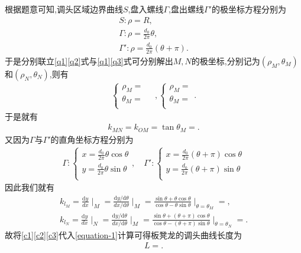 \documentclass[lang=cn,newtx,10pt,scheme=chinese]{../Template/elegantbook}
\begin{document}
根据题意可知,调头区域边界曲线$S$,盘入螺线$\varGamma$,盘出螺线$\varGamma'$的极坐标方程分别为
\begin{gather}
S:\rho =R,\label{q1}
\\
\varGamma:\rho =\frac{d_0}{2\pi}\theta ,\label{q2}
\\
\varGamma':\rho =\frac{d_0}{2\pi}\left( \theta +\pi \right) .\label{q3}
\end{gather}
于是分别联立\eqref{q1}\eqref{q2}式与\eqref{q1}\eqref{q3}式可分别解出$M,N$的极坐标,分别记为$(\rho_M,\theta_M)$和$(\rho_N,\theta_N)$,则有
\begin{gather}
\begin{cases}
\rho _M=\\
\theta _M=\\
\end{cases}
\quad,
\begin{cases}
\rho _M=\\
\theta _M=\\
\end{cases}.
\end{gather}
于是就有
\begin{align}
k_{MN}=k_{OM}=\tan \theta _M=.\label{c1}
\end{align}
又因为$\varGamma$与$\varGamma'$的直角坐标方程分别为
\begin{align}
\varGamma :\begin{cases}
x=\frac{d_0}{2\pi}\theta \cos \theta\\
y=\frac{d_0}{2\pi}\theta \sin \theta\\
\end{cases},\quad \varGamma ' :\begin{cases}
x=\frac{d_0}{2\pi}\left( \theta +\pi \right) \cos \theta\\
y=\frac{d_0}{2\pi}\left( \theta +\pi \right) \sin \theta\\
\end{cases}
\end{align}
因此我们就有
\begin{gather}
k_{l_M}=\frac{\mathrm{d}y}{dx}\mid_{M}^{}=\frac{\mathrm{d}y/\mathrm{d}\theta}{dx/\mathrm{d}\theta}\mid_{M}^{}=\frac{\sin \theta +\theta \cos \theta}{\cos \theta -\theta \sin \theta}\mid_{\theta =\theta _M}^{}=,\label{c2}
\\
k_{l_N}=\frac{\mathrm{d}y}{dx}\mid_{N}^{}=\frac{\mathrm{d}y/\mathrm{d}\theta}{dx/\mathrm{d}\theta}\mid_{M}^{}=\frac{\sin \theta +\left( \theta +\pi \right) \cos \theta}{\cos \theta -\left( \theta +\pi \right) \sin \theta}\mid_{\theta =\theta _N}^{}=.\label{c3}
\end{gather}
故将\eqref{c1}\eqref{c2}\eqref{c3}代入\eqref{equation-1}计算可得板凳龙的调头曲线长度为
\begin{align}
L=.
\end{align}
\end{document}
